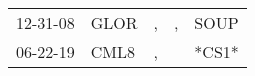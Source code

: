 \begin{supertabular}{lllll}
 12-31-08 &  GLOR &  , &  , &   SOUP \\
 06-22-19 &  CML8 &  , &    &  *CS1* \\
\end{supertabular}
